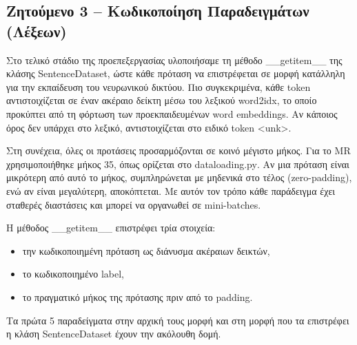 \documentclass[11pt,a4paper]{article}
\begin{document}
\subsection*{Ζητούμενο 3 -- Κωδικοποίηση Παραδειγμάτων (Λέξεων)}

Στο τελικό στάδιο της προεπεξεργασίας υλοποιήσαμε τη μέθοδο \textlatin{\_\_getitem\_\_} της κλάσης \textlatin{SentenceDataset}, ώστε 
κάθε πρόταση να επιστρέφεται σε μορφή κατάλληλη για την εκπαίδευση του νευρωνικού δικτύου. Πιο συγκεκριμένα, κάθε \textlatin{token} 
αντιστοιχίζεται σε έναν ακέραιο δείκτη μέσω του λεξικού \textlatin{word2idx}, το οποίο προκύπτει από τη φόρτωση των προεκπαιδευμένων 
\textlatin{word embeddings}. Αν κάποιος όρος δεν υπάρχει στο λεξικό, αντιστοιχίζεται στο ειδικό \textlatin{token} \textlatin{<unk>}.

Στη συνέχεια, όλες οι προτάσεις προσαρμόζονται σε κοινό μέγιστο μήκος. Για το \textlatin{MR} χρησιμοποιήθηκε μήκος 35, όπως ορίζεται στο 
\textlatin{dataloading.py}. Αν μια πρόταση είναι μικρότερη από αυτό το μήκος, συμπληρώνεται με μηδενικά στο τέλος (\textlatin{zero-padding}), 
ενώ αν είναι μεγαλύτερη, αποκόπτεται. Με αυτόν τον τρόπο κάθε παράδειγμα έχει σταθερές διαστάσεις και μπορεί να οργανωθεί σε \textlatin{mini-batches}.

Η μέθοδος \textlatin{\_\_getitem\_\_} επιστρέφει τρία στοιχεία:
\begin{itemize}
  \item την κωδικοποιημένη πρόταση ως διάνυσμα ακέραιων δεικτών,
  \item το κωδικοποιημένο \textlatin{label},
  \item το πραγματικό μήκος της πρότασης πριν από το \textlatin{padding}.
\end{itemize}

Τα πρώτα 5 παραδείγματα στην αρχική τους μορφή και στη μορφή που τα επιστρέφει η κλάση \textlatin{SentenceDataset} έχουν την ακόλουθη δομή.
\end{document}
